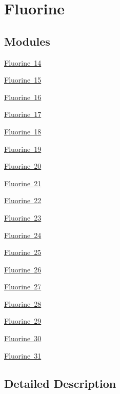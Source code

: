 \hypertarget{group___isotope_const-_fluorine}{}\section{Fluorine}
\label{group___isotope_const-_fluorine}
\subsection*{Modules}
\begin{DoxyCompactItemize}
\item 
\mbox{\hyperlink{group___isotope_const-_fluorine-_f14}{Fluorine 14}}
\item 
\mbox{\hyperlink{group___isotope_const-_fluorine-_f15}{Fluorine 15}}
\item 
\mbox{\hyperlink{group___isotope_const-_fluorine-_f16}{Fluorine 16}}
\item 
\mbox{\hyperlink{group___isotope_const-_fluorine-_f17}{Fluorine 17}}
\item 
\mbox{\hyperlink{group___isotope_const-_fluorine-_f18}{Fluorine 18}}
\item 
\mbox{\hyperlink{group___isotope_const-_fluorine-_f19}{Fluorine 19}}
\item 
\mbox{\hyperlink{group___isotope_const-_fluorine-_f20}{Fluorine 20}}
\item 
\mbox{\hyperlink{group___isotope_const-_fluorine-_f21}{Fluorine 21}}
\item 
\mbox{\hyperlink{group___isotope_const-_fluorine-_f22}{Fluorine 22}}
\item 
\mbox{\hyperlink{group___isotope_const-_fluorine-_f23}{Fluorine 23}}
\item 
\mbox{\hyperlink{group___isotope_const-_fluorine-_f24}{Fluorine 24}}
\item 
\mbox{\hyperlink{group___isotope_const-_fluorine-_f25}{Fluorine 25}}
\item 
\mbox{\hyperlink{group___isotope_const-_fluorine-_f26}{Fluorine 26}}
\item 
\mbox{\hyperlink{group___isotope_const-_fluorine-_f27}{Fluorine 27}}
\item 
\mbox{\hyperlink{group___isotope_const-_fluorine-_f28}{Fluorine 28}}
\item 
\mbox{\hyperlink{group___isotope_const-_fluorine-_f29}{Fluorine 29}}
\item 
\mbox{\hyperlink{group___isotope_const-_fluorine-_f30}{Fluorine 30}}
\item 
\mbox{\hyperlink{group___isotope_const-_fluorine-_f31}{Fluorine 31}}
\end{DoxyCompactItemize}


\subsection{Detailed Description}
